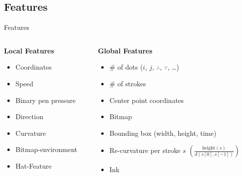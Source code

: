 \subsection{Features}
\begin{frame}{Features}
    \begin{columns}[T] %
    \begin{column}[T]{5cm} %
        \textbf{Local Features}
        \begin{itemize}
            \item Coordinates
            \item Speed
            \item Binary pen pressure
            \item Direction
            \item Curvature
            \item Bitmap-environment
            \item Hat-Feature
        \end{itemize}
    \end{column}
    \begin{column}[T]{6cm} %
        \textbf{Global Features}
        \begin{itemize}
            \item \# of dots ($i$, $j$, $\therefore$, $\because$, \dots)
            \item \# of strokes
            \item Center point coordinates
            \item Bitmap
            \item Bounding box (width, height, time)
            \item Re-curvature per stroke $s$ $\left ( \frac{\text{height}(s)}{d(s[0], s[-1])} \right )$
            \item Ink
        \end{itemize}
    \end{column}
    \end{columns}
\end{frame}